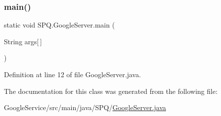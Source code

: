 \subsubsection{\texorpdfstring{main()}{main()}}
{\footnotesize\ttfamily static void S\+P\+Q.\+Google\+Server.\+main (\begin{DoxyParamCaption}\item[{String}]{args\mbox{[}$\,$\mbox{]} }\end{DoxyParamCaption})\hspace{0.3cm}{\ttfamily [static]}}



Definition at line 12 of file Google\+Server.\+java.



The documentation for this class was generated from the following file\+:\begin{DoxyCompactItemize}
\item 
Google\+Service/src/main/java/\+S\+P\+Q/\mbox{\hyperlink{_google_server_8java}{Google\+Server.\+java}}\end{DoxyCompactItemize}
